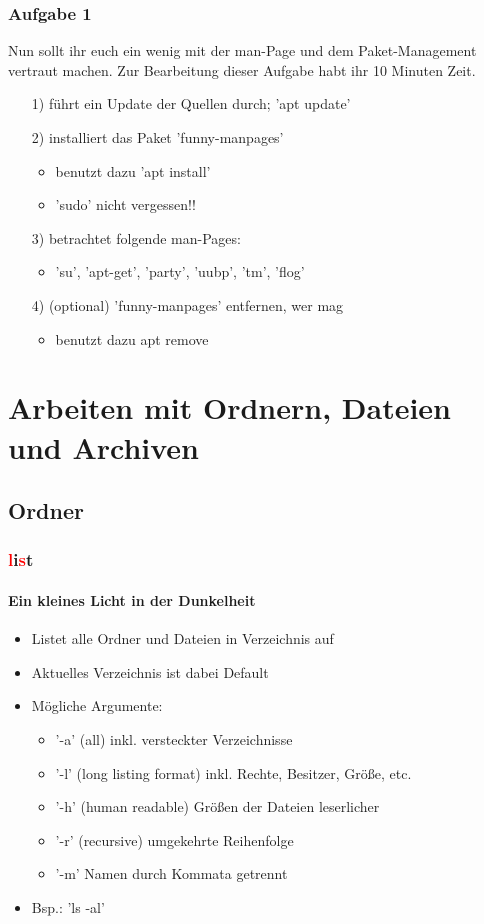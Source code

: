 \documentclass[12pt,utf8]{beamer}
\begin{document}
\begin{frame}
\frametitle{Aufgabe 1}
Nun sollt ihr euch ein wenig mit der man-Page und dem Paket-Management vertraut machen. Zur Bearbeitung dieser Aufgabe habt ihr 10 Minuten Zeit.
\begin{itemize}
	\item[1)] führt ein Update der Quellen durch; 'apt update'
	\item[2)] installiert das Paket 'funny-manpages'
	\begin{itemize}
		\item benutzt dazu 'apt install'
		\item 'sudo' nicht vergessen!!
	\end{itemize}
	\item[3)] betrachtet folgende man-Pages:
	\begin{itemize}
		\item 'su', 'apt-get', 'party', 'uubp', 'tm', 'flog'
	\end{itemize}
	\item[4)] (optional) 'funny-manpages' entfernen, wer mag
	\begin{itemize}
		\item benutzt dazu apt remove
	\end{itemize}
\end{itemize} 
\end{frame}

\section{Arbeiten mit Ordnern, Dateien und Archiven}
\subsection{Ordner}
\begin{frame}
\frametitle{\textcolor{red}{l}i\textcolor{red}{s}t}
\framesubtitle{\textcolor{ownDarkOr}{Ein kleines Licht in der Dunkelheit}}
\begin{itemize}
	\item Listet alle Ordner und Dateien in Verzeichnis auf
	\item Aktuelles Verzeichnis ist dabei Default
	\item Mögliche Argumente:
	\begin{itemize}[<+->]
		\item '-a'  (all) inkl. versteckter Verzeichnisse
		\item '-l'  (long listing format) inkl. Rechte, Besitzer, Größe, etc.
		\item '-h'  (human readable) Größen der Dateien leserlicher
		\item '-r'  (recursive) umgekehrte Reihenfolge
		\item '-m'  Namen durch Kommata getrennt
	\end{itemize}
	\item Bsp.: 'ls -al'
\end{itemize}
\end{frame}
\end{document}
